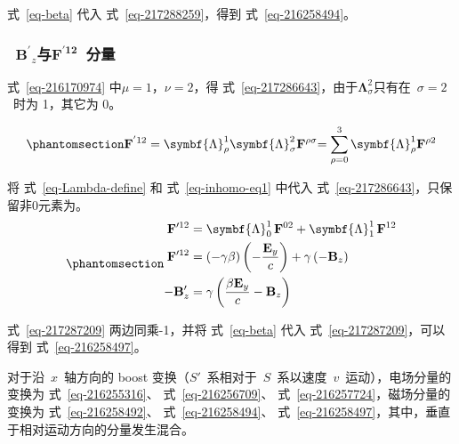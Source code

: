 \documentclass[
  chinese,
  a4paper,
  UTF8,
  12pt,
  oneside,
  openany]{ctexbook}
\begin{document}
式~\ref{eq-beta} 代入 式~\ref{eq-217288259}，得到
式~\ref{eq-216258494}。

\subsubsection{\texorpdfstring{~\({\mathbf{B}^{\mathbf{'}}}_{z}\)与\(\mathbf{F}^{\mathbf{'12}}\)~分量}{~\{\textbackslash mathbf\{B\}\^{}\{\textbackslash mathbf\{\textquotesingle\}\}\}\_\{z\}与\textbackslash mathbf\{F\}\^{}\{\textbackslash mathbf\{\}\}~分量}}\label{mathbfbmathbf_zux4e0emathbffmathbf12-ux5206ux91cf}

式~\ref{eq-216170974} 中\(\mu = 1\)，\(\nu = 2\)，得
式~\ref{eq-217286643}，由于\(\symbf{\Lambda}_{\sigma}^{2}\)只有在~\(\sigma = 2\)~时为
1，其它为 0。

\begin{equation}\protect\phantomsection\label{eq-217286643}{
{\mathbf{F}^{'12} = \symbf{\Lambda}_{\rho}^{1}\symbf{\Lambda}_{\sigma}^{2}\mathbf{F}^{\rho\sigma}
  }{= \sum_{\rho = 0}^{3}{\symbf{\Lambda}_{\rho}^{1}\mathbf{F}^{\rho 2}}}
}\end{equation}

将 式~\ref{eq-Lambda-define} 和 式~\ref{eq-inhomo-eq1} 中代入
式~\ref{eq-217286643}，只保留非0元素为。
\begin{equation}\protect\phantomsection\label{eq-217287209}{
\begin{aligned}
\mathbf{F}'^{12}
&= \symbf{\Lambda}_{0}^{1}\,\mathbf{F}^{02} + \symbf{\Lambda}_{1}^{1}\,\mathbf{F}^{12} \\
\mathbf{F}'^{12}
&= (-\gamma\beta)\left(-\frac{\mathbf{E}_{y}}{c}\right) + \gamma\left(-\mathbf{B}_{z}\right) \\
-\mathbf{B}'_{z}
&= \gamma\left( \frac{\beta\mathbf{E}_{y}}{c} - \mathbf{B}_{z} \right)
\end{aligned}
}\end{equation}

式~\ref{eq-217287209} 两边同乘-1，并将 式~\ref{eq-beta} 代入
式~\ref{eq-217287209}，可以得到 式~\ref{eq-216258497}。

对于沿~\(x\)~轴方向的 boost
变换（\(S'\)~系相对于~\(S\)~系以速度~\(v\)~运动），电场分量的变换为
式~\ref{eq-216255316}、 式~\ref{eq-216256709}、
式~\ref{eq-216257724}，磁场分量的变换为 式~\ref{eq-216258492}、
式~\ref{eq-216258494}、
式~\ref{eq-216258497}，其中，垂直于相对运动方向的分量发生混合。
\end{document}
